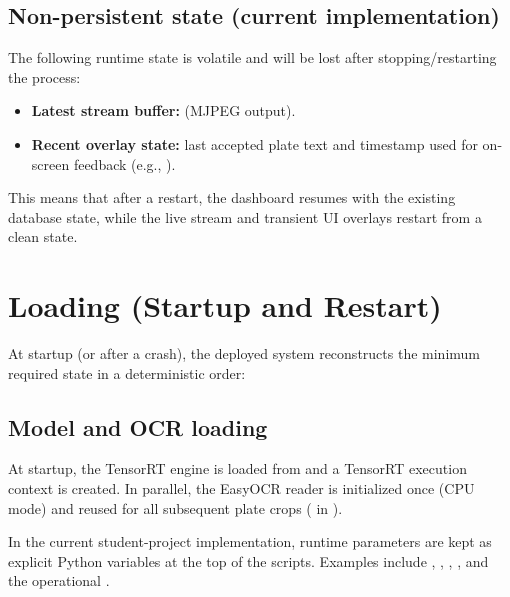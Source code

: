 \subsection{Non-persistent state (current implementation)}

\noindent
The following runtime state is volatile and will be lost after stopping/restarting the process:
\begin{itemize}
	\item \textbf{Latest stream buffer:}  (MJPEG output).
	\item \textbf{Recent overlay state:} last accepted plate text and timestamp used for on-screen feedback (e.g., ).
\end{itemize}

\noindent
This means that after a restart, the dashboard resumes with the existing database state, while the live stream and transient UI overlays restart from a clean state.

\section{Loading (Startup and Restart)}
\label{sec:devtodep_loading}

\noindent
At startup (or after a crash), the deployed system reconstructs the minimum required state in a deterministic order:

\subsection{Model and OCR loading}

\noindent
At startup, the TensorRT engine is loaded from  and a TensorRT execution context is created.
In parallel, the EasyOCR reader is initialized once (CPU mode) and reused for all subsequent plate crops ( in ).


\noindent
In the current student-project implementation, runtime parameters are kept as explicit Python variables
at the top of the scripts. Examples include , ,
, , and the operational
.

